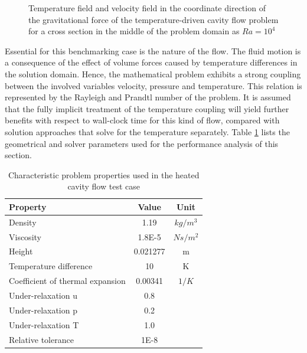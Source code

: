 \begin{figure}[h!]
{\begin{minipage}{0.45\textwidth}
\end{minipage} }
\caption{Temperature field and velocity field in the coordinate direction of the gravitational force of the temperature-driven cavity flow problem for a cross section in the middle of the problem domain as \(Ra = 10^4\) }
  \label{fig:sketchcavity}
\end{figure}

Essential for this benchmarking case is the nature of the flow. The fluid motion is a consequence of the effect of volume forces caused by temperature differences in the solution domain. Hence, the mathematical problem exhibits a strong coupling between the involved variables velocity, pressure and temperature. This relation is represented by the Rayleigh and Prandtl number of the problem. It is assumed that the fully implicit treatment of the temperature coupling will yield further benefits with respect to wall-clock time for this kind of flow, compared with solution approaches that solve for the temperature separately. Table \ref{tab:cavity} lists the geometrical and solver parameters used for the performance analysis of this section.

\begin{table}[h!]\centering
  \caption{Characteristic problem properties used in the heated cavity flow test case}
  \begin{tabular}{lcc}\toprule
    Property & Value & Unit \\
    \midrule
    \rowcolor{tud0a} Density            & 1.19      & $kg/m^3$  \\
    \rowcolor{black!00} Viscosity          & 1.8E-5    & $Ns/m^2$  \\
    \rowcolor{tud0a} Height             & 0.021277  & m         \\
    \rowcolor{black!00} Temperature difference & 10    & K         \\
    \rowcolor{tud0a} Coefficient of thermal expansion & 0.00341 & $1/K$ \\
    \rowcolor{black!00} Under-relaxation u & 0.8       &           \\
    \rowcolor{tud0a} Under-relaxation p & 0.2       &           \\
    \rowcolor{black!00} Under-relaxation T & 1.0       &           \\
    \rowcolor{tud0a} Relative tolerance & 1E-8      &
  \end{tabular}
  \label{tab:cavity}
\end{table}

